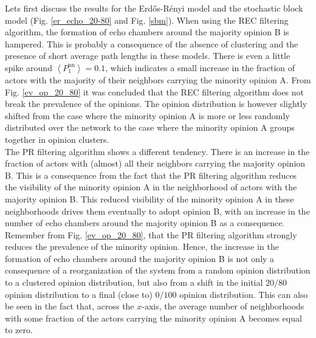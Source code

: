 \documentclass[11 pt , letterpaper , twoside , openright]{book}
\begin{document}
\noindent
Lets first discuss the results for the Erd\H{o}s-R\'{e}nyi model and the stochastic block model (Fig. \ref{er_echo_20-80} and Fig. \ref{sbm}). When using the REC filtering algorithm, the formation of echo chambers around the majority opinion B is hampered. This is probably a consequence of the absence of clustering and the presence of short average path lengths in these models. There is even a little spike around $\left<P_1^{\text{nn}}\right> = 0.1$, which indicates a small increase in the fraction of actors with the majority of their neighbors carrying the minority opinion A. From Fig. \ref{ev_op_20_80} it was concluded that the REC filtering algorithm does not break the prevalence of the opinions. The opinion distribution is however slightly shifted from the case where the minority opinion A is more or less randomly distributed over the network to the case where the minority opinion A groups together in opinion clusters. \\
\newline
The PR filtering algorithm shows a different tendency. There is an increase in the fraction of actors with (almost) all their neighbors carrying the majority opinion B. This is a consequence from the fact that the PR filtering algorithm reduces the visibility of the minority opinion A in the neighborhood of actors with the majority opinion B. This reduced visibility of the minority opinion A in these neighborhoods drives them eventually to adopt opinion B, with an increase in the number of echo chambers around the majority opinion B as a consequence. Remember from Fig. \ref{ev_op_20_80}, that the PR filtering algorithm strongly reduces the prevalence of the minority opinion. Hence, the increase in the formation of echo chambers around the majority opinion B is not only a consequence of a reorganization of the system from a random opinion distribution to a clustered opinion distribution, but also from a shift in the initial $20/80$ opinion distribution to a final (close to) $0/100$ opinion distribution. This can also be seen in the fact that, across the $x$-axis, the average number of neighborhoods with some fraction of the actors carrying the minority opinion A becomes equal to zero. \\
\newline
\end{document}
